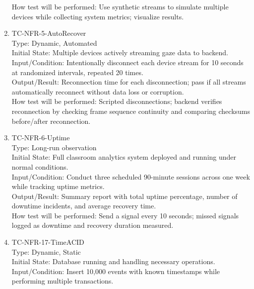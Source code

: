 \documentclass[12pt, titlepage]{article}
\begin{document}
\begin{enumerate}
How test will be performed: Use synthetic streams to simulate multiple devices while collecting system metrics; visualize results.

\item{TC-NFR-5-AutoRecover\\}
Type: Dynamic, Automated\\

Initial State: Multiple devices actively streaming gaze data to backend.\\

Input/Condition: Intentionally disconnect each device stream for 10 seconds at randomized intervals, repeated 20 times.\\

Output/Result: Reconnection time for each disconnection; pass if all streams automatically reconnect without data loss or corruption.\\

How test will be performed: Scripted disconnections; backend verifies reconnection by checking frame sequence continuity and comparing checksums before/after reconnection.

\item{TC-NFR-6-Uptime\\}
Type: Long-run observation\\

Initial State: Full classroom analytics system deployed and running under normal conditions.\\

Input/Condition: Conduct three scheduled 90-minute sessions across one week while tracking uptime metrics.\\

Output/Result: Summary report with total uptime percentage, number of downtime incidents, and average recovery time.\\

How test will be performed: Send a signal every 10 seconds; missed signals logged as downtime and recovery duration measured.

\item{TC-NFR-17-TimeACID\\}
Type: Dynamic, Static\\

Initial State: Database running and handling necessary operations.\\

Input/Condition: Insert 10,000 events with known timestamps while performing multiple transactions.\\


\end{enumerate}
\end{document}
